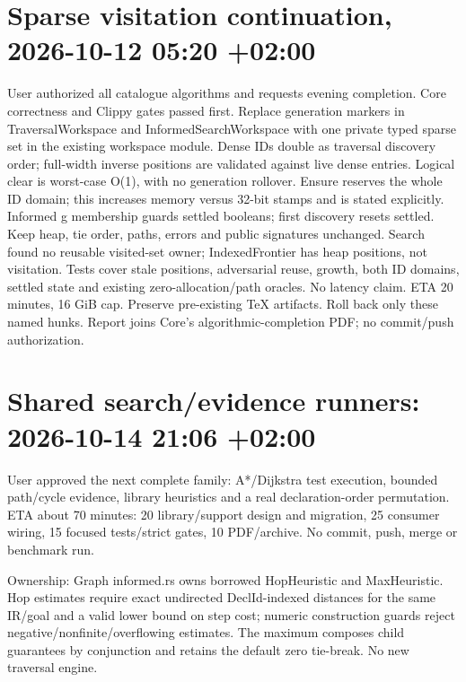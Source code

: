 \documentclass[11pt]{article}
\begin{document}
\section*{Sparse visitation continuation, 2026-10-12 05:20 +02:00}
User authorized all catalogue algorithms and requests evening completion.
Core correctness and Clippy gates passed first. Replace generation markers in
TraversalWorkspace and InformedSearchWorkspace with one private typed sparse set
in the existing workspace module. Dense IDs double as traversal discovery order;
full-width inverse positions are validated against live dense entries. Logical
clear is worst-case O(1), with no generation rollover. Ensure reserves the whole
ID domain; this increases memory versus 32-bit stamps and is stated explicitly.
Informed g membership guards settled booleans; first discovery resets settled.
Keep heap, tie order, paths, errors and public signatures unchanged. Search found
no reusable visited-set owner; IndexedFrontier has heap positions, not visitation.
Tests cover stale positions, adversarial reuse, growth, both ID domains, settled
state and existing zero-allocation/path oracles. No latency claim. ETA 20 minutes,
16 GiB cap. Preserve pre-existing TeX artifacts. Roll back only these named hunks.
Report joins Core's algorithmic-completion PDF; no commit/push authorization.

\clearpage\section*{Shared search/evidence runners: 2026-10-14 21:06 +02:00}
User approved the next complete family: A*/Dijkstra test execution, bounded
path/cycle evidence, library heuristics and a real declaration-order permutation.
ETA about 70 minutes: 20 library/support design and migration, 25 consumer wiring,
15 focused tests/strict gates, 10 PDF/archive. No commit, push, merge or benchmark run.

Ownership: Graph informed.rs owns borrowed HopHeuristic and MaxHeuristic.
Hop estimates require exact undirected DeclId-indexed distances for the same
IR/goal and a valid lower bound on step cost; numeric construction guards reject
negative/nonfinite/overflowing estimates. The maximum composes child guarantees
by conjunction and retains the default zero tie-break. No new traversal engine.
\end{document}
